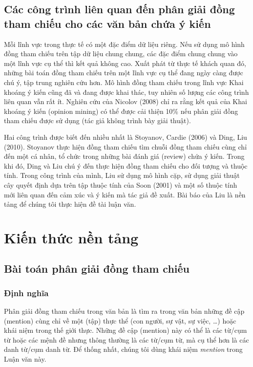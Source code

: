 \documentclass[12pt]{report}
\begin{document}
		\section{Các công trình liên quan đến phân giải đồng tham chiếu cho các văn bản chứa ý kiến}
			\par Mỗi lĩnh vực trong thực tế có một đặc điểm dữ liệu riêng. Nếu sử dụng mô hình đồng tham chiếu trên tập dữ liệu chung chung, các đặc điểm chung chung vào một lĩnh vực cụ thể thì kết quả không cao. Xuất phát từ thực tế khách quan đó, những bài toán đồng tham chiếu trên một lĩnh vực cụ thể đang ngày càng được chú ý, tập trung nghiên cứu hơn. Mô hình đồng tham chiếu trong lĩnh vực Khai khoáng ý kiến cũng đã và đang được khai thác, tuy nhiên số lượng các công trình liên quan vẫn rất ít. Nghiên cứu của Nicolov (2008)\cite{nicolov08} chỉ ra rằng kết quả của Khai khoáng ý kiến (opinion mining) có thể được cải thiện 10\% nếu phân giải đồng tham chiếu được sử dụng (tác giả không trình bày giải thuật). 
			\par Hai công trình được biết đến nhiều nhất là Stoyanov, Cardie (2006)\cite{stoyanov06} và Ding, Liu (2010)\cite{mainpaper}. Stoyanov thực hiện đồng tham chiếu tìm chuỗi đồng tham chiếu cùng chỉ đến một cá nhân, tổ chức trong những bài đánh giá (review) chứa ý kiến. Trong khi đó, Ding và Liu chú ý đến thực hiện đồng tham chiếu cho đối tượng và thuộc tính. Trong công trình của mình, Liu sử dụng mô hình cặp, sử dụng giải thuật cây quyết định dựa trên tập thuộc tính của Soon (2001)\cite{soon01} và một số thuộc tính mới liên quan đến cảm xúc và ý kiến mà tác giả đề xuất. Bài báo của Liu là nền tảng để chúng tôi thực hiện đề tài luận văn.

	\chapter{Kiến thức nền tảng}	
		\section{Bài toán phân giải đồng tham chiếu}			
			\label{coref_problem}
			\subsection*{Định nghĩa}
				Phân giải đồng tham chiếu trong văn bản là tìm ra trong văn bản những đề cập (mention) cùng chỉ về một (tập) thực thể (con người, sự vật, sự việc, …) hoặc khái niệm trong thế giới thực. Những đề cập (mention) này có thể là các từ/cụm từ hoặc các mệnh đề nhưng thông thường là các từ/cụm từ, mà cụ thể hơn là các danh từ/cụm danh từ. Để thống nhất, chúng tôi dùng khái niệm \textit{mention} trong Luận văn này.
\end{document}
